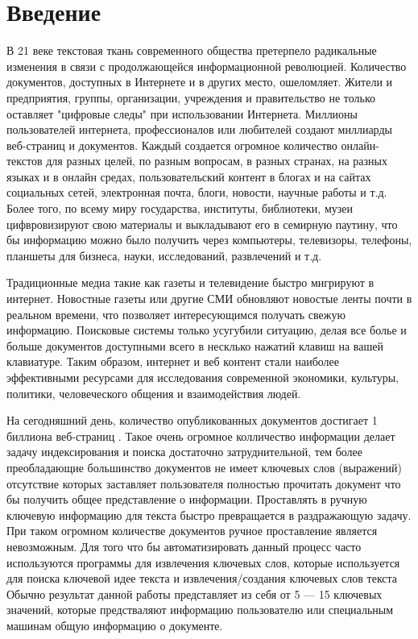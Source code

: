 \section{Введение}
В 21 веке текстовая ткань современного общества претерпело радикальные изменения в связи с продолжающейся информационной революцией.
Количество документов, доступных в Интернете и в других место, ошеломляет.
Жители и предприятия, группы, организации, учреждения и правительство не только оставляет "цифровые следы" при использовании Интернета.
Миллионы пользователей интернета, профессионалов или любителей создают миллиарды веб-страниц и документов.
Каждый создается огромное количество онлайн-текстов для разных целей, по разным вопросам, в разных странах, на разных языках и в онлайн средах, пользовательский контент в блогах и на сайтах социальных сетей, электронная почта, блоги, новости, научные работы и т.д.
Более того, по всему миру государства, институты, библиотеки, музеи цифвровизируют свою материалы и выкладывают его в семирную паутину, что бы информацию можно было получить через компьютеры, телевизоры, телефоны, планшеты для бизнеса, науки, исследований, развлечений и т.д. \cite{2}

Традиционные медиа такие как газеты и телевидение быстро мигрируют в интернет.
Новостные газеты или другие СМИ обновляют новостые ленты почти в реальном времени, что позволяет интересующимся получать свежую информацию.
Поисковые системы только усугубили ситуацию, делая все болье и больше документов доступными всего в несклько нажатий клавиш на вашей клавиатуре.
Таким образом, интернет и веб контент стали наиболее эффективными ресурсами для исследования современной экономики, культуры, политики, человеческого общения и взаимодействия людей. \cite{2}

На сегодняшний день, количество опубликованных документов достигает 1 биллиона веб-страниц \cite{1}. 
Такое очень огромное колличество информации делает задачу индексирования и поиска достаточно затруднительной, тем более преобладающие большинство документов не имеет ключевых слов (выражений) отсутствие которых заставляет пользователя полностью прочитать документ что бы получить общее представление о информации.
Проставлять в ручную ключевую информацию для текста быстро превращается в раздражающую задачу. 
При таком огромном количестве документов ручное проставление является невозможным. 
Для того что бы автоматизировать данный процесс часто используются программы для извлечения ключевых слов, которые используется для поиска ключевой идее текста и извлечения/создания ключевых слов текста
Обычно результат данной работы представляет из себя от 5 — 15 ключевых значений, которые предстваляют информацию пользователю или специальным машинам общую информацию о документе.


